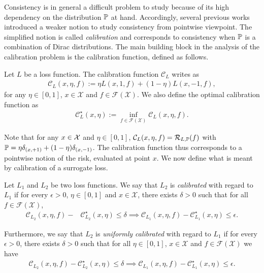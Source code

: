 Consistency is in general a difficult problem to study because of its high dependency on the distribution $\mathbb{P}$ at hand. Accordingly, several previous works~\citep{zhang2004statistical,bartlett2002rademacher,steinwart2007compare} introduced a weaker notion to study consistency from pointwise viewpoint. The simplified notion is called \textit{calibration} and corresponds to consistency when $\mathbb{P}$ is a combination of Dirac distributions. The main building block in the analysis of the calibration problem is the calibration function, defined as follows.

\begin{definition}
Let $L$ be a loss function. The calibration function $\mathcal{C}_L$ writes as
\begin{align*}
    \mathcal{C}_L(x,\eta,f):=\eta L(x,1,f) +(1-\eta) L(x,-1,f),
\end{align*}
for any $\eta\in[0,1]$, $x\in\mathcal{X}$ and $f\in\mathcal{F}(\mathcal{X})$. We also define the optimal calibration function as
\begin{align*}
        \mathcal{C}^\star_L(x,\eta):=\inf_{f\in\mathcal{\mathcal{F}(\mathcal{X})}}\mathcal{C}_L(x,\eta,f).
\end{align*}

\end{definition}

Note that for any $x\in\mathcal{X}$ and $\eta\in[0,1]$, $\mathcal{C}_L(x,\eta,f) =\mathcal{R}_{L,\mathbb{P}}(f)$ with $\mathbb{P} = \eta \delta_{(x,+1)}+ (1-\eta)\delta_{(x,-1)}$. The calibration function thus corresponds to a pointwise notion of the risk, evaluated at point $x$. We now define what is meant by calibration of a surrogate loss.

\begin{definition}[Calibration]
Let $L_1$ and $L_2$ be two loss functions. We say that $L_2$ is \emph{calibrated} with regard to $L_1$ if for every $\epsilon>0$, $\eta\in[0,1]$ and $x\in\mathcal{X}$, there exists $ \delta>0$ such that for all $f\in\mathcal{F}(\mathcal{X})$,
\begin{align*}
    \mathcal{C}_{L_2}(x,\eta,f)- &\mathcal{C}^\star_{L_2}(x,\eta)\leq\delta\implies\mathcal{C}_{L_1}(x,\eta,f)- \mathcal{C}^\star_{L_1}(x,\eta)\leq \epsilon.
\end{align*}

Furthermore, we say that $L_2$ is \emph{uniformly calibrated} with regard to $L_1$ if for every $\epsilon>0$, there exists $ \delta>0$ such that for all $\eta\in[0,1]$, $x\in\mathcal{X}$ and $f\in\mathcal{F}(\mathcal{X})$ we have
\begin{align*}
    \mathcal{C}_{L_2}(x,\eta,f)- \mathcal{C}^\star_{L_2}(x,\eta)\leq\delta\implies\mathcal{C}_{L_1}(x,\eta,f)- \mathcal{C}^\star_{L_1}(x,\eta)\leq \epsilon.
\end{align*}
\end{definition}

